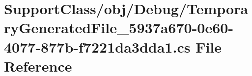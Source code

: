 \hypertarget{_support_class_2obj_2_debug_2_temporary_generated_file__5937a670-0e60-4077-877b-f7221da3dda1_8cs}{}\section{Support\+Class/obj/\+Debug/\+Temporary\+Generated\+File\+\_\+5937a670-\/0e60-\/4077-\/877b-\/f7221da3dda1.cs File Reference}
\label{_support_class_2obj_2_debug_2_temporary_generated_file__5937a670-0e60-4077-877b-f7221da3dda1_8cs}
